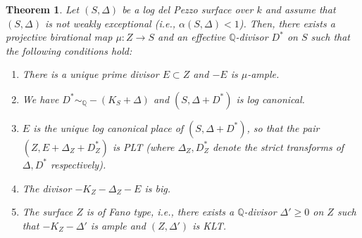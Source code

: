 \documentclass[11pt,reqno]{amsart}
\newcommand{\Q}{\mathbb{Q}}
\numberwithin{equation}{section}
\newtheorem{thm}[prop] {Theorem}
\theoremstyle{definition}
\begin{document}
\begin{thm} \label{thm:specialdivisor}
    Let $(S,\Delta)$ be a log del Pezzo surface over $k$ and assume that $(S, \Delta)$ is not weakly exceptional (i.e., $\alpha (S, \Delta)< 1$). Then, there exists a projective birational map $\mu: Z \to S$ and an effective $\Q$-divisor $D^*$ on $S$ such that the following conditions hold:
    \begin{enumerate}
        \item There is a unique prime divisor $E \subset Z$ and $-E$ is $\mu$-ample.

        \item We have $D^* \sim _\Q -(K_S + \Delta)$ and $(S, \Delta+ D^*)$ is log canonical.

        \item $E$ is the unique log canonical place of $(S, \Delta+ D^*)$, so that the pair $(Z, E + \Delta_Z + D^*_Z)$ is PLT (where $ \Delta_Z, D_Z ^*$ denote the strict transforms of $\Delta,D^*$ respectively).

        \item The divisor $-K_Z - \Delta_Z - E$ is big.

        \item The surface $Z$ is of Fano type, i.e., there exists a $\Q$-divisor $\Delta' \geq 0$ on $Z$ such that $-K_Z - \Delta'$ is ample and $(Z, \Delta')$ is KLT.
    \end{enumerate}
\end{thm}
\end{document}

